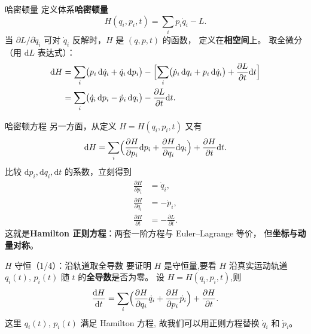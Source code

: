 \documentclass[fontset=windows, chinese, 10pt, xcolor=dvipsnames]{beamer}
\begin{document}
\begin{frame}{哈密顿量}
  定义体系\textbf{哈密顿量}
  \begin{equation*}
    H(q_i,p_i,t) = \sum_i p_i \dot q_i - L.
  \end{equation*}
  当 $\partial L/\partial \dot q_i$ 可对 $\dot q_i$ 反解时，$H$ 是 $(q,p,t)$ 的函数，
  定义在\textbf{相空间}上。
  取全微分（用 $\mathrm{d}L$ 表达式）：
  \begin{align*}
    \mathrm{d} H
    &= \sum_i\bigl(p_i\,\mathrm{d}\dot q_i + \dot q_i\,\mathrm{d}p_i\bigr)
       - \Bigl[\sum_i\bigl(\dot p_i\,\mathrm{d}q_i + p_i\,\mathrm{d}\dot q_i\bigr)
               + \frac{\partial L}{\partial t}\mathrm{d}t\Bigr] \\
    &= \sum_i\bigl(\dot q_i\,\mathrm{d}p_i - \dot p_i\,\mathrm{d}q_i\bigr)
       - \frac{\partial L}{\partial t}\mathrm{d}t.
  \end{align*}
\end{frame}

\begin{frame}{哈密顿方程}
  另一方面，从定义 $H=H(q_i,p_i,t)$ 又有
  \begin{equation*}
    \mathrm{d} H
    = \sum_i\Bigl(\frac{\partial H}{\partial p_i}\mathrm{d}p_i
                  + \frac{\partial H}{\partial q_i}\mathrm{d}q_i\Bigr)
      + \frac{\partial H}{\partial t}\mathrm{d}t.
  \end{equation*}
  比较 $\mathrm{d}p_i,\mathrm{d}q_i,\mathrm{d}t$ 的系数，立刻得到
  \begin{align*}
    \frac{\partial H}{\partial p_i} &= \dot q_i, \\
    \frac{\partial H}{\partial q_i} &= -\dot p_i, \\
    \frac{\partial H}{\partial t} &= -\frac{\partial L}{\partial t}.
  \end{align*}
  这就是\textbf{Hamilton 正则方程}：两套一阶方程与 Euler--Lagrange 等价，
  但\textbf{坐标与动量对称}。
\end{frame}

\begin{frame}{$H$ 守恒（1/4）：沿轨道取全导数}
  要证明 $H$ 是守恒量,要看 $H$ 沿真实运动轨道
  $q_i(t),\,p_i(t)$ 随 $t$ 的\textbf{全导数}是否为零。
  设 $H=H(q_i,p_i,t)$,则
  \begin{equation*}
    \frac{\mathrm{d}H}{\mathrm{d}t}
    = \sum_i\Bigl(\frac{\partial H}{\partial q_i}\dot q_i
                  + \frac{\partial H}{\partial p_i}\dot p_i\Bigr)
      + \frac{\partial H}{\partial t}.
  \end{equation*}
  这里 $q_i(t),\,p_i(t)$ 满足 Hamilton 方程,
  故我们可以用正则方程替换 $\dot q_i$ 和 $\dot p_i$。
\end{frame}
\end{document}
